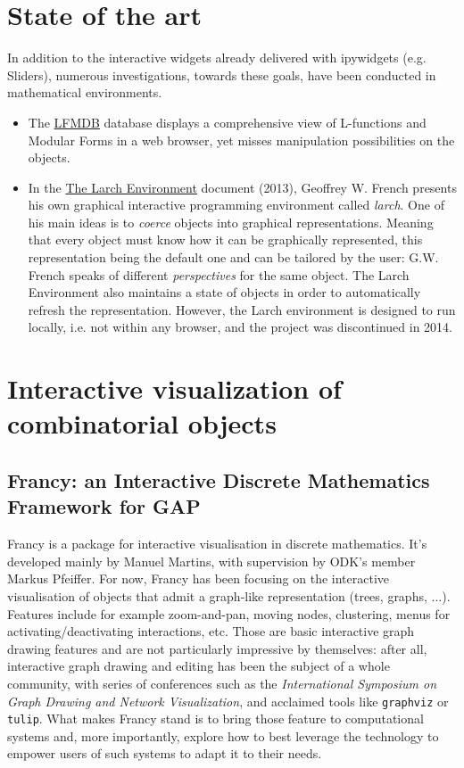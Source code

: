\documentclass{deliverablereport}
\begin{document}
\section{State of the art}


In addition to the interactive widgets already delivered with ipywidgets (e.g. Sliders), numerous investigations, towards these goals, have been conducted in mathematical environments.

\begin{itemize}
\item The \href{http://www.lmfdb.org/}{LFMDB} database displays a comprehensive view of L-functions and Modular Forms in a web browser, yet misses manipulation possibilities on the objects.
\item In the \href{https://core.ac.uk/download/pdf/9839511.pdf}{The
  Larch Environment} document (2013), Geoffrey W. French presents his own graphical
  interactive programming environment called \emph{larch}.
  One of his main ideas is to
  \emph{coerce} objects into graphical representations. Meaning that
  every object must know how it can be graphically represented, this
  representation being the default one and can be tailored by the
  user: G.W. French speaks of different \emph{perspectives} for the
  same object. The Larch Environment also maintains a state of objects
  in order to automatically refresh the representation.
  However, the Larch environment is designed to run locally, i.e. not
  within any browser, and the project was discontinued in 2014.
\end{itemize}

\section{Interactive visualization of combinatorial objects}
\label{section:combi}

\subsection{Francy: an Interactive Discrete Mathematics Framework for GAP}
\label{francy}

Francy is a package for interactive visualisation in discrete
mathematics. It's developed mainly by Manuel Martins, with supervision
by ODK's member Markus Pfeiffer. For now, Francy has been focusing on
the interactive visualisation of objects that admit a graph-like
representation (trees, graphs, ...). Features include for example
zoom-and-pan, moving nodes, clustering, menus for
activating/deactivating interactions, etc. Those are basic interactive
graph drawing features and are not particularly impressive by
themselves: after all, interactive graph drawing and editing has been
the subject of a whole community, with series of conferences such as
the \emph{International Symposium on Graph Drawing and Network
  Visualization}, and acclaimed tools like \lstinline{graphviz} or
\lstinline{tulip}. What makes Francy stand is to bring those feature
to computational systems and, more importantly, explore how to best
leverage the technology to empower users of such systems to adapt it
to their needs.
\end{document}
